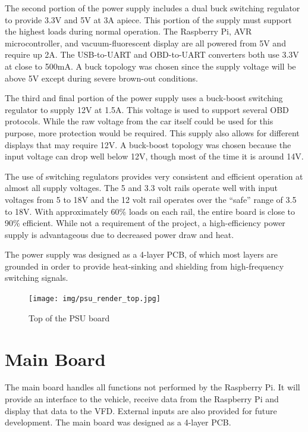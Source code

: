 The second portion of the power supply includes a dual buck switching regulator
to provide 3.3V and 5V at 3A apiece.  This portion of the supply must support 
the highest loads during normal operation.  The Raspberry Pi, AVR 
microcontroller, and vacuum-fluorescent display are all powered from 5V and 
require up 2A.  The USB-to-UART \cite{ft2232hds} and OBD-to-UART \cite{stn1110ds} converters both use 3.3V at 
close to 500mA.  A buck topology was chosen since the supply voltage will be
above 5V except during severe brown-out conditions.

The third and final portion of the power supply uses a buck-boost switching
regulator \cite{ltc3115ds} to supply 12V at 1.5A.  This voltage is used to support several
OBD protocols.  While the raw voltage from the car itself could be used
for this purpose, more protection would be required.  This supply also allows
for different displays that may require 12V.  A buck-boost topology was chosen
because the input voltage can drop well below 12V, though most of the time it is
around 14V.

The use of switching regulators provides very consistent and efficient operation
at almost all supply voltages.  The 5 and 3.3 volt rails operate well with input
voltages from 5 to 18V and the 12 volt rail operates over the ``safe'' range of
3.5 to 18V.  With approximately 60\% loads on each rail, the entire board is close
to 90\% efficient.  While not a requirement of the project, a high-efficiency power
supply is advantageous due to decreased power draw and heat.

The power supply was
designed as a 4-layer PCB, of which most layers are grounded in order to provide 
heat-sinking and shielding from high-frequency switching signals.

\begin{figure}[h]
\texttt{[image: img/psu\_render\_top.jpg]}
\caption{Top of the PSU board}
\label{fig:psu render}
\end{figure}

\section{Main Board}
The main board handles all functions not performed by the Raspberry Pi.  It will
provide an interface to the vehicle, receive data from the Raspberry Pi and 
display that data to the VFD.  External inputs are also provided for future 
development.  The main board was designed as a 4-layer PCB.

